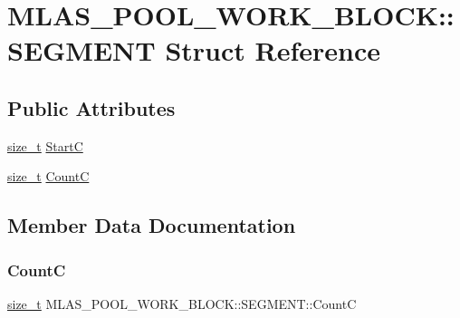 \hypertarget{structMLAS__POOL__WORK__BLOCK_1_1SEGMENT}{}\section{M\+L\+A\+S\+\_\+\+P\+O\+O\+L\+\_\+\+W\+O\+R\+K\+\_\+\+B\+L\+O\+CK\+:\+:S\+E\+G\+M\+E\+NT Struct Reference}
\label{structMLAS__POOL__WORK__BLOCK_1_1SEGMENT}
\subsection*{Public Attributes}
\begin{DoxyCompactItemize}
\item 
\mbox{\hyperlink{mlasi_8h_a503efbc1c6e50825320ad909366b78ab}{size\+\_\+t}} \mbox{\hyperlink{structMLAS__POOL__WORK__BLOCK_1_1SEGMENT_ab71d5a617f526468815b94fcbdb95877}{StartC}}
\item 
\mbox{\hyperlink{mlasi_8h_a503efbc1c6e50825320ad909366b78ab}{size\+\_\+t}} \mbox{\hyperlink{structMLAS__POOL__WORK__BLOCK_1_1SEGMENT_aeb9865f11a6000d9c0452206e1059b49}{CountC}}
\end{DoxyCompactItemize}


\subsection{Member Data Documentation}
\mbox{\label{structMLAS__POOL__WORK__BLOCK_1_1SEGMENT_aeb9865f11a6000d9c0452206e1059b49}} 
\subsubsection{\texorpdfstring{CountC}{CountC}}
{\footnotesize\ttfamily \mbox{\hyperlink{mlasi_8h_a503efbc1c6e50825320ad909366b78ab}{size\+\_\+t}} M\+L\+A\+S\+\_\+\+P\+O\+O\+L\+\_\+\+W\+O\+R\+K\+\_\+\+B\+L\+O\+C\+K\+::\+S\+E\+G\+M\+E\+N\+T\+::\+CountC}

